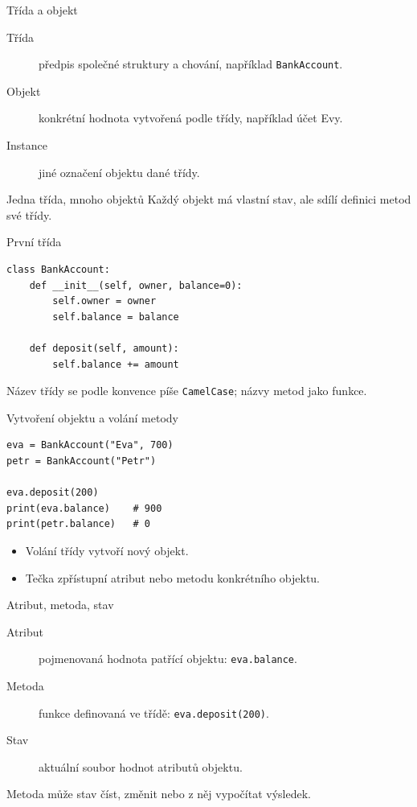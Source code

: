 \documentclass[aspectratio=169]{beamer}
\begin{document}
\begin{frame}{Třída a objekt}
  \begin{description}
    \item[Třída] předpis společné struktury a chování, například \texttt{BankAccount}.
    \item[Objekt] konkrétní hodnota vytvořená podle třídy, například účet Evy.
    \item[Instance] jiné označení objektu dané třídy.
  \end{description}
  \begin{block}{Jedna třída, mnoho objektů}
    Každý objekt má vlastní stav, ale sdílí definici metod své třídy.
  \end{block}
\end{frame}

\begin{frame}[fragile]{První třída}
\begin{lstlisting}[style=python]
class BankAccount:
    def __init__(self, owner, balance=0):
        self.owner = owner
        self.balance = balance

    def deposit(self, amount):
        self.balance += amount
\end{lstlisting}
  Název třídy se podle konvence píše \texttt{CamelCase}; názvy metod jako funkce.
\end{frame}

\begin{frame}[fragile]{Vytvoření objektu a volání metody}
\begin{lstlisting}[style=python]
eva = BankAccount("Eva", 700)
petr = BankAccount("Petr")

eva.deposit(200)
print(eva.balance)    # 900
print(petr.balance)   # 0
\end{lstlisting}
  \begin{itemize}
    \item Volání třídy vytvoří nový objekt.
    \item Tečka zpřístupní atribut nebo metodu konkrétního objektu.
  \end{itemize}
\end{frame}

\begin{frame}{Atribut, metoda, stav}
  \begin{description}
    \item[Atribut] pojmenovaná hodnota patřící objektu: \texttt{eva.balance}.
    \item[Metoda] funkce definovaná ve třídě: \texttt{eva.deposit(200)}.
    \item[Stav] aktuální soubor hodnot atributů objektu.
  \end{description}
  Metoda může stav číst, změnit nebo z něj vypočítat výsledek.
\end{frame}
\end{document}
